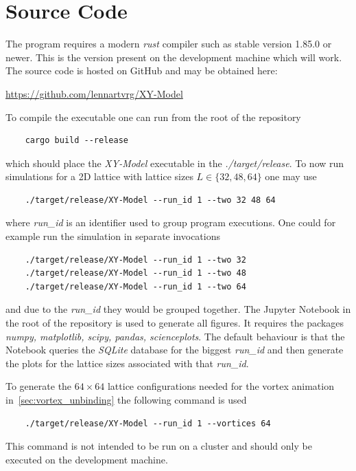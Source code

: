 \section{Source Code}\label{app:source_code}
The program requires a modern \emph{rust} compiler such as stable version 1.85.0 or newer. This is the version present on the development machine which will work. The source code is hosted on GitHub and may be obtained here:
\begin{center}
	\url{https://github.com/lennartvrg/XY-Model}
\end{center}
To compile the executable one can run from the root of the repository
\begin{verbatim}
	cargo build --release
\end{verbatim}
which should place the \textit{XY-Model} executable in the \textit{./target/release}. To now run simulations for a 2D lattice with lattice sizes $L\in\{32, 48, 64\}$ one may use
\begin{verbatim}
	./target/release/XY-Model --run_id 1 --two 32 48 64
\end{verbatim}
where \textit{{run\_id}} is an identifier used to group program executions. One could for example run the simulation in separate invocations
\begin{verbatim}
	./target/release/XY-Model --run_id 1 --two 32
	./target/release/XY-Model --run_id 1 --two 48
	./target/release/XY-Model --run_id 1 --two 64
\end{verbatim}
and due to the \textit{{run\_id}} they would be grouped together. The Jupyter Notebook in the root of the repository is used to generate all figures. It requires the packages \textit{numpy, matplotlib, scipy, pandas, scienceplots}. The default behaviour is that the Notebook queries the \emph{SQLite} database for the biggest \textit{{run\_id}} and then generate the plots for the lattice sizes associated with that \textit{{run\_id}}.

To generate the $64\times64$ lattice configurations needed for the vortex animation in~\cref{sec:vortex_unbinding} the following command is used
\begin{verbatim}
	./target/release/XY-Model --run_id 1 --vortices 64
\end{verbatim}
This command is not intended to be run on a cluster and should only be executed on the development machine.

